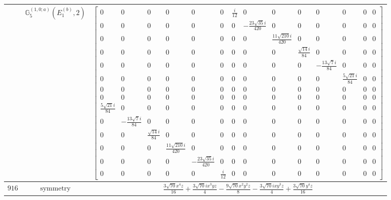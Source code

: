 \documentclass[fleqn,8pt,landscape]{jsarticle}
\begin{document}
\begin{longtable}{ccc}
$  $ & $ \mathbb{G}_{5}^{(1,0;a)}(E_{1}^{(b)},2) $ & $ \begin{bmatrix} 0 & 0 & 0 & 0 & 0 & 0 & \frac{i}{12} & 0 & 0 & 0 & 0 & 0 & 0 & 0 \\ 0 & 0 & 0 & 0 & 0 & 0 & 0 & - \frac{23 \sqrt{35} i}{420} & 0 & 0 & 0 & 0 & 0 & 0 \\ 0 & 0 & 0 & 0 & 0 & 0 & 0 & 0 & \frac{11 \sqrt{210} i}{420} & 0 & 0 & 0 & 0 & 0 \\ 0 & 0 & 0 & 0 & 0 & 0 & 0 & 0 & 0 & \frac{\sqrt{14} i}{84} & 0 & 0 & 0 & 0 \\ 0 & 0 & 0 & 0 & 0 & 0 & 0 & 0 & 0 & 0 & - \frac{13 \sqrt{7} i}{84} & 0 & 0 & 0 \\ 0 & 0 & 0 & 0 & 0 & 0 & 0 & 0 & 0 & 0 & 0 & \frac{5 \sqrt{21} i}{84} & 0 & 0 \\ 0 & 0 & 0 & 0 & 0 & 0 & 0 & 0 & 0 & 0 & 0 & 0 & 0 & 0 \\ 0 & 0 & 0 & 0 & 0 & 0 & 0 & 0 & 0 & 0 & 0 & 0 & 0 & 0 \\ \frac{5 \sqrt{21} i}{84} & 0 & 0 & 0 & 0 & 0 & 0 & 0 & 0 & 0 & 0 & 0 & 0 & 0 \\ 0 & - \frac{13 \sqrt{7} i}{84} & 0 & 0 & 0 & 0 & 0 & 0 & 0 & 0 & 0 & 0 & 0 & 0 \\ 0 & 0 & \frac{\sqrt{14} i}{84} & 0 & 0 & 0 & 0 & 0 & 0 & 0 & 0 & 0 & 0 & 0 \\ 0 & 0 & 0 & \frac{11 \sqrt{210} i}{420} & 0 & 0 & 0 & 0 & 0 & 0 & 0 & 0 & 0 & 0 \\ 0 & 0 & 0 & 0 & - \frac{23 \sqrt{35} i}{420} & 0 & 0 & 0 & 0 & 0 & 0 & 0 & 0 & 0 \\ 0 & 0 & 0 & 0 & 0 & \frac{i}{12} & 0 & 0 & 0 & 0 & 0 & 0 & 0 & 0 \end{bmatrix} $ \\ \hline
$ 916 $ & $ \text{symmetry} $ & $ \frac{3 \sqrt{70} x^{4} z}{16} + \frac{3 \sqrt{70} i x^{3} y z}{4} - \frac{9 \sqrt{70} x^{2} y^{2} z}{8} - \frac{3 \sqrt{70} i x y^{3} z}{4} + \frac{3 \sqrt{70} y^{4} z}{16} $ \\

\end{longtable}
\end{document}
